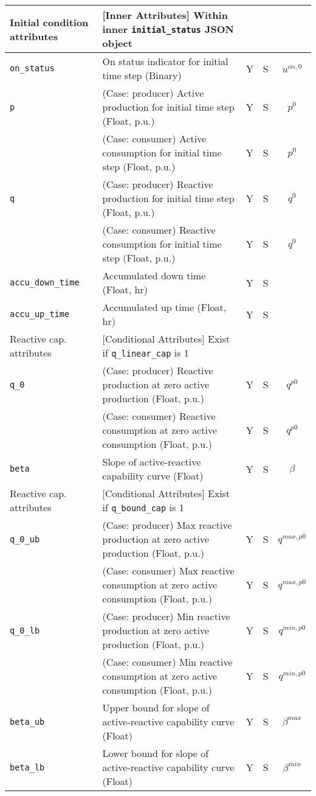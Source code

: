 \documentclass{article}
\begin{document}
\begin{center}
\small
\begin{tabular}{ l | l | c | c | c |}
  Initial condition attributes &  [Inner Attributes] Within inner {\tt initial\_status} JSON object &  &  & \\
  \hline
  {\tt on\_status} & On status indicator for initial time step (Binary) & Y & S & $u^{on,0}$\\
  {\tt p} & { (Case: producer) Active production for initial time step (Float, p.u.) }& Y & S & $p^0$ \\
          & { (Case: consumer) Active consumption for initial time step (Float, p.u.) }& Y & S & $p^0$ \\
  {\tt q} & { (Case: producer) Reactive production for initial time step (Float, p.u.) }& Y & S & $q^0$ \\
          & { (Case: consumer) Reactive consumption for initial time step (Float, p.u.) }& Y & S & $q^0$ \\
  {\tt accu\_down\_time} & Accumulated down time (Float, hr) & Y & S & \\
  {\tt accu\_up\_time} & Accumulated up time (Float, hr) & Y & S & \\
 \hline
 \hline
  Reactive cap. attributes & [Conditional Attributes] Exist if {\tt q\_linear\_cap} is 1 &  &  & \\
  \hline
  {\tt q\_0}               & { (Case: producer) Reactive production at zero active production (Float, p.u.) }& Y & S & $q^{p0}$\\
                           & { (Case: consumer) Reactive consumption at zero active consumption (Float, p.u.) }& Y & S & $q^{p0}$\\
  {\tt beta}          & Slope of active-reactive capability curve (Float) & Y & S & $\beta$\\
  \hline
  Reactive cap. attributes & [Conditional Attributes] Exist if {\tt q\_bound\_cap} is 1 &  &  & \\
  \hline
  {\tt q\_0\_ub}           & { (Case: producer) Max reactive production at zero active production (Float, p.u.)} & Y & S & $q^{max,p0}$\\
                           & { (Case: consumer) Max reactive consumption at zero active consumption (Float, p.u.)} & Y & S & $q^{max,p0}$\\
  {\tt q\_0\_lb}           & { (Case: producer) Min reactive production at zero active production (Float, p.u.)} & Y & S & $q^{min,p0}$\\
                           & { (Case: consumer) Min reactive consumption at zero active consumption (Float, p.u.)} & Y & S & $q^{min,p0}$\\
  {\tt beta\_ub}      & Upper bound for slope of active-reactive capability curve (Float) & Y & S & $\beta^{max}$\\
  {\tt beta\_lb}      & Lower bound for slope of active-reactive capability curve (Float) & Y & S & $\beta^{min}$\\
  \hline
  
\end{tabular}
\end{center}
\end{document}
